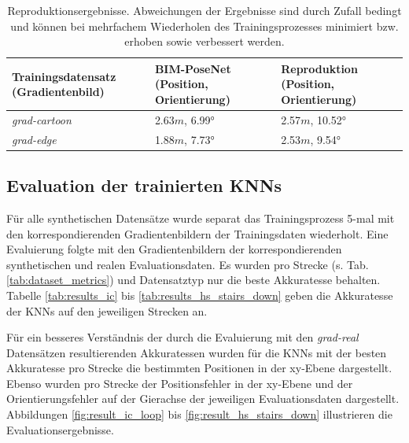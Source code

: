 \begin{table}[b]
	\centering
	\caption{Reproduktionsergebnisse. Abweichungen der Ergebnisse sind durch Zufall bedingt und können bei mehrfachem Wiederholen des Trainingsprozesses minimiert bzw. erhoben sowie verbessert werden. }
	\begin{tabularx}{1.0\textwidth}{X X X}
		\textbf{Trainingsdatensatz} \hspace{2cm} (Gradientenbild) & \textbf{BIM-PoseNet} \hspace{2cm} (Position, Orientierung) & \textbf{Reproduktion} \hspace{2cm} (Position, Orientierung)\\
		\hline
	 \textit{grad-cartoon} & 2.63$m$, 6.99° & 2.57$m$, 10.52°\\
		\hline
		\textit{grad-edge} & 1.88$m$, 7.73°  & 2.53$m$, 9.54°\\
	\end{tabularx}
	\label{tab:reproduction}
\end{table}





\subsection{Evaluation der trainierten KNNs}
Für alle synthetischen Datensätze wurde separat das Trainingsprozess 5-mal mit den korrespondierenden Gradientenbildern der Trainingsdaten wiederholt. Eine Evaluierung folgte mit den Gradientenbildern der korrespondierenden synthetischen und realen Evaluationsdaten. Es wurden pro Strecke (s. Tab. \ref{tab:dataset_metrics}) und Datensatztyp nur die beste Akkuratesse behalten. Tabelle \ref{tab:results_ic} bis \ref{tab:results_hs_stairs_down} geben die Akkuratesse der KNNs auf den jeweiligen Strecken an. 

Für ein besseres Verständnis der durch die Evaluierung mit den \textit{grad-real} Datensätzen resultierenden Akkuratessen wurden für die KNNs mit der besten Akkuratesse pro Strecke die bestimmten Positionen in der xy-Ebene dargestellt. Ebenso wurden pro Strecke der Positionsfehler in der xy-Ebene und der Orientierungsfehler auf der Gierachse der jeweiligen Evaluationsdaten dargestellt. Abbildungen \ref{fig:result_ic_loop} bis \ref{fig:result_hs_stairs_down} illustrieren die Evaluationsergebnisse.


